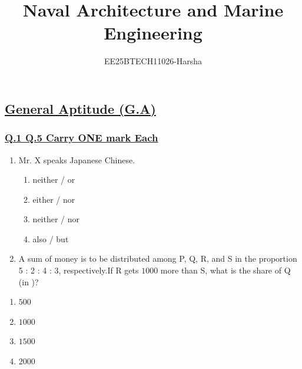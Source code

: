 \documentclass[journal]{IEEEtran}
\theoremstyle{remark}
\begin{document}

\onecolumn

\title{Naval Architecture and Marine Engineering}
\author{EE25BTECH11026-Harsha}
\maketitle

\renewcommand{\thefigure}{\theenumi}
\renewcommand{\thetable}{\theenumi}
\setcounter{secnumdepth}{0}
\subsection{\underline{\textbf{General Aptitude (G.A)}}}
\subsubsection{\underline{Q.1 \text{-} Q.5 Carry ONE mark Each}}
\setlength{\parskip}{1em}

\begin{enumerate}[itemsep=1em]
\item Mr. X speaks \underline{\hspace{2cm}} Japanese \underline{\hspace{2cm}} Chinese. 
\begin{multicols}{4}
\begin{enumerate}
         \item neither / or 
         \item either / nor 
         \item neither / nor  
         \item also / but
\end{enumerate}
\end{multicols}
\end{enumerate}

\begin{enumerate}[itemsep=1em]
\setcounter{enumi}{1}
\item A sum of money is to be distributed among P, Q, R, and S in the proportion 5 : 2 : 4 : 3, respectively.If R gets  \rupee $1000$ more than S, what is the share of Q (in \rupee )? 
\end{enumerate}
\begin{multicols}{4}
\begin{enumerate}
    \item $500$
    \item $1000$
    \item $1500$
    \item $2000$
\end{enumerate}
\end{multicols}
\end{document}
